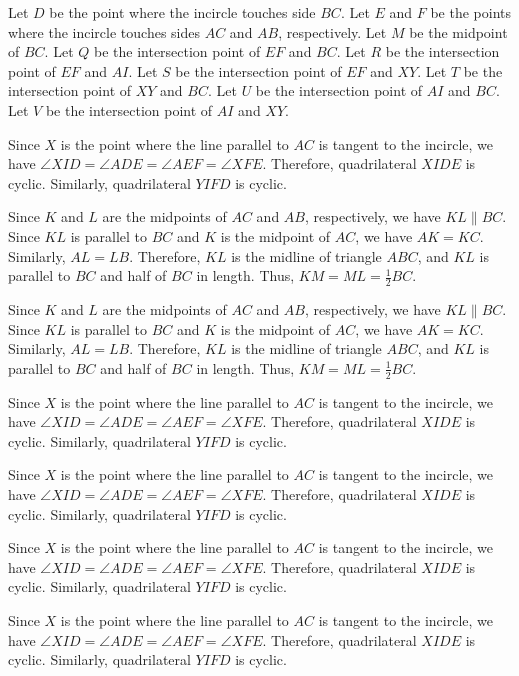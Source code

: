 Let $D$ be the point where the incircle touches side $BC$. Let $E$ and $F$ be the points where the incircle touches sides $AC$ and $AB$, respectively. Let $M$ be the midpoint of $BC$. Let $Q$ be the intersection point of $EF$ and $BC$. Let $R$ be the intersection point of $EF$ and $AI$. Let $S$ be the intersection point of $EF$ and $XY$. Let $T$ be the intersection point of $XY$ and $BC$. Let $U$ be the intersection point of $AI$ and $BC$. Let $V$ be the intersection point of $AI$ and $XY$.

Since $X$ is the point where the line parallel to $AC$ is tangent to the incircle, we have $\angle XID = \angle ADE = \angle AEF = \angle XFE$. Therefore, quadrilateral $XIDE$ is cyclic. Similarly, quadrilateral $YIFD$ is cyclic.

Since $K$ and $L$ are the midpoints of $AC$ and $AB$, respectively, we have $KL \parallel BC$. Since $KL$ is parallel to $BC$ and $K$ is the midpoint of $AC$, we have $AK = KC$. Similarly, $AL = LB$. Therefore, $KL$ is the midline of triangle $ABC$, and $KL$ is parallel to $BC$ and half of $BC$ in length. Thus, $KM = ML = \frac{1}{2}BC$.

Since $K$ and $L$ are the midpoints of $AC$ and $AB$, respectively, we have $KL \parallel BC$. Since $KL$ is parallel to $BC$ and $K$ is the midpoint of $AC$, we have $AK = KC$. Similarly, $AL = LB$. Therefore, $KL$ is the midline of triangle $ABC$, and $KL$ is parallel to $BC$ and half of $BC$ in length. Thus, $KM = ML = \frac{1}{2}BC$.

Since $X$ is the point where the line parallel to $AC$ is tangent to the incircle, we have $\angle XID = \angle ADE = \angle AEF = \angle XFE$. Therefore, quadrilateral $XIDE$ is cyclic. Similarly, quadrilateral $YIFD$ is cyclic.

Since $X$ is the point where the line parallel to $AC$ is tangent to the incircle, we have $\angle XID = \angle ADE = \angle AEF = \angle XFE$. Therefore, quadrilateral $XIDE$ is cyclic. Similarly, quadrilateral $YIFD$ is cyclic.

Since $X$ is the point where the line parallel to $AC$ is tangent to the incircle, we have $\angle XID = \angle ADE = \angle AEF = \angle XFE$. Therefore, quadrilateral $XIDE$ is cyclic. Similarly, quadrilateral $YIFD$ is cyclic.

Since $X$ is the point where the line parallel to $AC$ is tangent to the incircle, we have $\angle XID = \angle ADE = \angle AEF = \angle XFE$. Therefore, quadrilateral $XIDE$ is cyclic. Similarly, quadrilateral $YIFD$ is cyclic.

